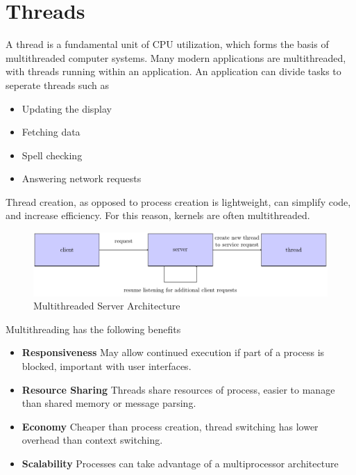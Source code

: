 \documentclass{book/custombook}
\begin{document}
    \chapter{Threads}
            A thread is a fundamental unit of CPU utilization, which forms the basis of multithreaded computer systems.
            Many modern applications are multithreaded, with threads running within an application. An application can divide tasks to seperate threads
            such as
            \begin{itemize}
                \item Updating the display
                \item Fetching data
                \item Spell checking
                \item Answering network requests
            \end{itemize}
            Thread creation, as opposed to process creation is lightweight, can simplify code, and increase efficiency. For this reason, kernels are often
            multithreaded.
            \begin{figure}[H]
                \centering
                \includegraphics{figures/multithreader_server.pdf}
                \caption{Multithreaded Server Architecture}
            \end{figure}
            Multithreading has the following benefits
            \begin{itemize}
                \item \textbf{Responsiveness}
                    \subitem May allow continued execution if part of a process is blocked, important with user interfaces.
                \item \textbf{Resource Sharing}
                    \subitem Threads share resources of process, easier to manage than shared memory or message parsing.
                \item \textbf{Economy}
                    \subitem Cheaper than process creation, thread switching has lower overhead than context switching.
                \item \textbf{Scalability}
                    \subitem Processes can take advantage of a multiprocessor architecture
            \end{itemize}
\end{document}
